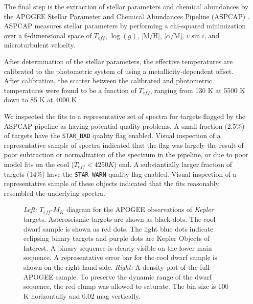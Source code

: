 \documentclass[manuscript]{aastex6}
\newcommand{\vsini}{\ensuremath{v \sin i}}
\newcommand{\Kepler}{\mbox{\textit{Kepler}}}
\newcommand{\Teff}{\ensuremath{T_{eff}}}
\newcommand{\logg}{\ensuremath{\log(g)}}
\newcommand{\STARBAD}{\texttt{STAR\_BAD}}
\newcommand{\STARWARN}{\texttt{STAR\_WARN}}
\begin{document}
The final step is the extraction of stellar parameters and chemical abundances
by the APOGEE Stellar Parameter and Chemical Abundances Pipeline (ASPCAP)
\citep{GarciaPerez16}. ASPCAP measures stellar parameters by performing a
chi-squared minimization \citep{AllendePrieto06} over a 6-dimensional space of
\Teff, \logg, [M/H], [\(\alpha\)/M], \vsini, and microturbulent velocity.

After determination of the stellar parameters, the effective temperatures are 
calibrated to the photometric system of \citet{GonzalezHernandez09} using a 
metallicity-dependent offset. After calibration, the scatter between the 
calibrated and photometric temperatures  were found to be a function of 
\Teff{}, ranging from 130 K at 5500 K down to 85 K at 4000 K
\citep{Holtzman18}.

We inspected the fits to a representative set of spectra for targets flagged 
by the ASPCAP pipeline as having potential quality problems. A small fraction
(2.5\%) of targets have the \STARBAD{} quality flag enabled. Visual inspection
of a representative sample of spectra indicated that the flag was largely the
result of poor subtraction or normalization of the spectrum in the pipeline, or
due to poor model fits on the cool (\(\Teff < 4250 K\)) end. A 
substantially larger fraction of targets (14\%) have the \STARWARN{} quality 
flag enabled. Visual inspection of a representative sample of these objects
indicated that the fits reasonably resembled the underlying spectra.

\begin{figure}[htb]
    \centering
    \caption{\emph{Left:} \Teff-\(M_K\) diagram for the APOGEE observations of
        \Kepler{} targets. Asteroseismic targets are shown as black dots. The
        cool dwarf sample is shown as red dots. The light blue dots indicate 
        eclipsing binary targets and purple dots are Kepler Objects of 
        Interest. A binary sequence is clearly visible on the lower main
        sequence. A representative error bar for the cool dwarf sample is 
        shown on the right-hand side. \emph{Right:} A density plot of the 
        full APOGEE sample. To preserve the dynamic range of the dwarf 
        sequence, the red clump was allowed to saturate. The bin size is 100 K
    horizontally and 0.02 mag vertically.}\label{fig:apogee_selection}
\end{figure}
\end{document}

